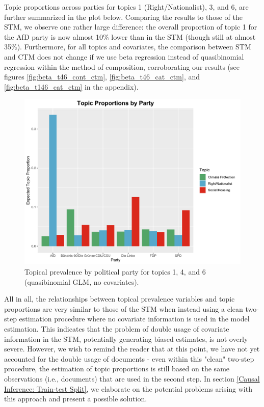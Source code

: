 Topic proportions across parties for topics 1 (Right/Nationalist), 3, and 6, are further summarized in the plot below. Comparing the results to those of the STM, we observe one rather large difference: the overall proportion of topic 1 for the AfD party is now almost 10\% lower than in the STM (though still at almost 35\%). Furthermore, for all topics and covariates, the comparison between STM and CTM does not change if we use beta regression instead of quasibinomial regression within the method of composition, corroborating our results (see figures \ref{fig:beta_t46_cont_ctm}, \ref{fig:beta_t46_cat_ctm}, and \ref{fig:beta_t146_cat_ctm} in the appendix).

\begin{figure}[h!]
  \centering
  \captionsetup{justification=centering,margin=2cm}
  \includegraphics[scale=0.5]{../plots/6_1/quasi_t146_cat_ctm.pdf}
  \caption{Topical prevalence by political party for topics 1, 4, and 6 (quasibinomial GLM, no covariates).}
  \label{fig:quasi_t146_cat_ctm}
\end{figure}

All in all, the relationships between topical prevalence variables and topic proportions are very similar to those of the STM when instead using a clean two-step estimation procedure where no covariate information is used in the model estimation. This indicates that the problem of double usage of covariate information in the STM, potentially generating biased estimates, is not overly severe. However, we wish to remind the reader that at this point, we have not yet accounted for the double usage of documents - even within this "clean" two-step procedure, the estimation of topic proportions is still based on the same observations (i.e., documents) that are used in the second step. In section \ref{Causal Inference: Train-test Split}, we elaborate on the potential problems arising with this approach and present a possible solution.